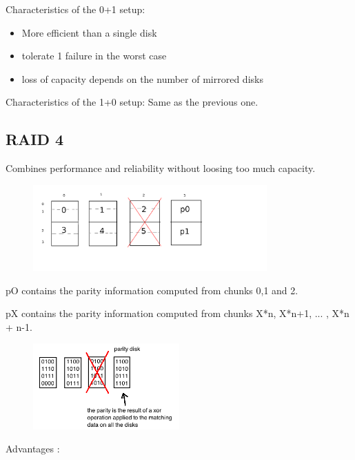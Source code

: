 Characteristics of the 0+1 setup:
\begin{itemize}
  \item More efficient than a single disk
  \item tolerate 1 failure in the worst case
  \item loss of capacity depends on the number of mirrored disks
\end{itemize}
Characteristics of the 1+0 setup:
Same as the previous one. 

\subsection{RAID 4}
Combines performance and reliability without loosing too much capacity.
\vspace{0.5cm}
\begin{figure}[h!]
  \begin{center}
    \includegraphics[width=0.8\textwidth]{raid_4.png}
  \end{center}
\end{figure}

pO contains the parity information computed from chunks 0,1 and 2.

pX contains the parity information computed from chunks X*n, X*n+1, ... , X*n + n-1.

\begin{figure}[h!]
  \begin{center}
    \includegraphics[width=0.5\textwidth]{parity_disk.png}
  \end{center}
\end{figure}

Advantages :

